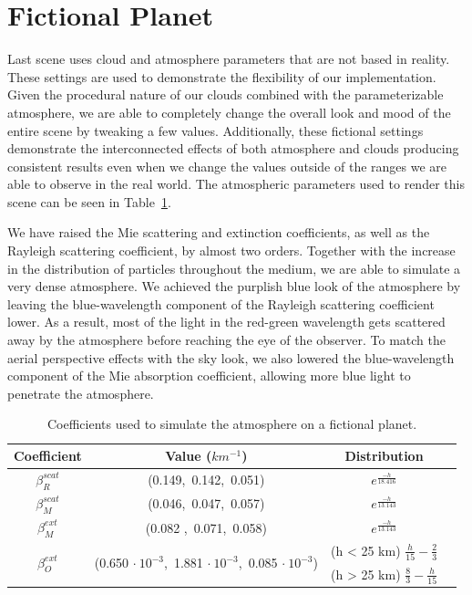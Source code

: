 \documentclass{ctuthesis}
\begin{document}
\section{Fictional Planet}
Last scene uses cloud and atmosphere parameters that are not based in reality. These settings are used to demonstrate
the flexibility of our implementation. Given the procedural nature of our clouds combined with the parameterizable atmosphere,
we are able to completely change the overall look and mood of the entire scene by tweaking a few values. Additionally, 
these fictional settings demonstrate the interconnected effects of both atmosphere and clouds producing 
consistent results even when we change the values outside of the ranges we are able to observe in the real world. The atmospheric
parameters used to render this scene can be seen in Table~\ref{tab:Fictional Coeff}. 

We have raised the Mie scattering and extinction coefficients, as well as the Rayleigh scattering coefficient, by almost two orders. 
Together with the increase in the distribution of particles throughout the medium, we are able to simulate a very dense
atmosphere. We achieved the purplish blue look of the atmosphere by leaving the blue-wavelength component of the Rayleigh
scattering coefficient lower. As a result, most of the light in the red-green wavelength gets scattered away by the atmosphere
before reaching the eye of the observer. To match the aerial perspective effects with the sky look, we also lowered the 
blue-wavelength component of the Mie absorption coefficient, allowing more blue light to penetrate the atmosphere.

\begin{center}
\begin{table}[h]
\begin{tabular}{ ||c|c|c|c|| } 
\hline
Coefficient & Value ($km^{-1}$) & Distribution \\
\hline
\hline
$\beta^{scat}_{R}$ & (0.149,\ 0.142,\ 0.051) & $e^{\frac{-h}{18.416}}$ \\
\hline
$\beta^{scat}_{M}$ & (0.046,\ 0.047,\ 0.057) & $e^{\frac{-h}{13.143}}$ \\
\hline
$\beta^{ext}_{M}$ & (0.082 ,\ 0.071,\ 0.058) & $e^{\frac{-h}{13.143}}$ \\
\hline
\multirow{2}{*}{$\beta^{ext}_{O}$} & \multirow{2}{*}{(0.650 $\cdot\ 10^{-3}$,\ 1.881 $\cdot\ 10^{-3}$,\ 0.085 $\cdot\ 10^{-3}$)} & (h < 25 km) $\frac{h}{15} - \frac{2}{3}$ \\
& & (h > 25 km) $\frac{8}{3}-\frac{h}{15}$ \\
\hline
\end{tabular}
\caption[Fictional coefficients]{\label{tab:Fictional Coeff} Coefficients used to simulate the atmosphere on a fictional planet.}
\end{table}
\end{center}
\end{document}
